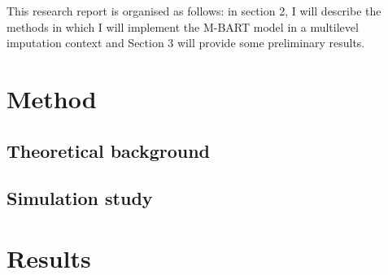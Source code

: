 \documentclass[10pt, a4paper, titlepage]{article}
\begin{document}
This research report is organised as follows: in section 2, I will describe the methods in which I will implement the M-BART model in a multilevel imputation context and Section 3 will provide some preliminary results.

\section{Method}

\subsection{Theoretical background}

\subsection{Simulation study}

\section{Results}

\newpage


\end{document}
